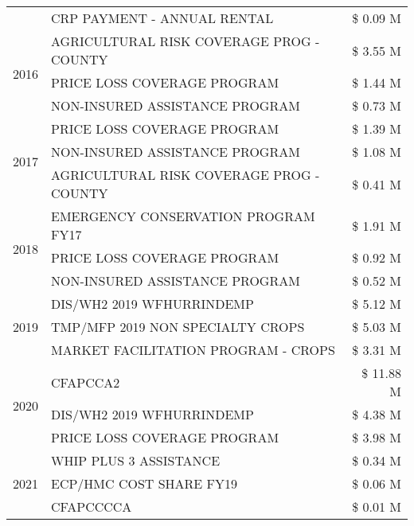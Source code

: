 \begin{tabular}{llr}
 & CRP PAYMENT - ANNUAL RENTAL & \$ 0.09 M \\
\cline{1-3}
\multirow[t]{3}{*}{2016} & AGRICULTURAL RISK COVERAGE PROG - COUNTY & \$ 3.55 M \\
 & PRICE LOSS COVERAGE PROGRAM & \$ 1.44 M \\
 & NON-INSURED ASSISTANCE PROGRAM & \$ 0.73 M \\
\cline{1-3}
\multirow[t]{3}{*}{2017} & PRICE LOSS COVERAGE PROGRAM & \$ 1.39 M \\
 & NON-INSURED ASSISTANCE PROGRAM & \$ 1.08 M \\
 & AGRICULTURAL RISK COVERAGE PROG - COUNTY & \$ 0.41 M \\
\cline{1-3}
\multirow[t]{3}{*}{2018} & EMERGENCY CONSERVATION PROGRAM FY17 & \$ 1.91 M \\
 & PRICE LOSS COVERAGE PROGRAM & \$ 0.92 M \\
 & NON-INSURED ASSISTANCE PROGRAM & \$ 0.52 M \\
\cline{1-3}
\multirow[t]{3}{*}{2019} & DIS/WH2 2019 WFHURRINDEMP & \$ 5.12 M \\
 & TMP/MFP 2019 NON SPECIALTY CROPS & \$ 5.03 M \\
 & MARKET FACILITATION PROGRAM - CROPS & \$ 3.31 M \\
\cline{1-3}
\multirow[t]{3}{*}{2020} & CFAPCCA2 & \$ 11.88 M \\
 & DIS/WH2 2019 WFHURRINDEMP & \$ 4.38 M \\
 & PRICE LOSS COVERAGE PROGRAM & \$ 3.98 M \\
\cline{1-3}
\multirow[t]{3}{*}{2021} & WHIP PLUS 3 ASSISTANCE & \$ 0.34 M \\
 & ECP/HMC COST SHARE FY19 & \$ 0.06 M \\
 & CFAPCCCCA & \$ 0.01 M \\
\cline{1-3}
\bottomrule
\end{tabular}
